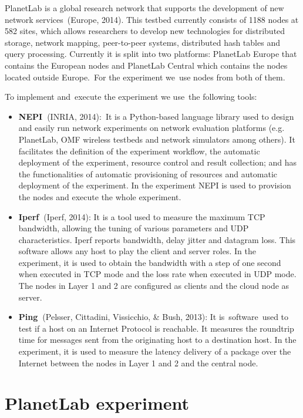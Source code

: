 \documentclass[a4paper]{article}
\newcommand\liststyleLFOiii{%
\renewcommand\labelitemi{[F0B7?]}
\renewcommand\labelitemii{o}
\renewcommand\labelitemiii{[F0A7?]}
\renewcommand\labelitemiv{[F0B7?]}
}
\begin{document}
PlanetLab is a global research network that supports the development of
new network services\ (Europe, 2014). This testbed currently consists
of 1188 nodes at 582 sites, which allows researchers to develop new
technologies for distributed storage, network mapping, peer-to-peer
systems, distributed hash tables and query processing. Currently it is
split into two platforms: PlanetLab Europe that contains the European
nodes and PlanetLab Central which contains the nodes located outside
Europe.\ For the experiment we\ use nodes from both of them.\ 

To implement and\ execute the experiment we use\ the following tools:\ 

\liststyleLFOiii
\begin{itemize}
\item \textbf{NEPI}\textbf{\ }(INRIA, 2014):\ It is a Python-based
language library used to design and easily run network experiments on
network evaluation platforms (e.g. PlanetLab, OMF wireless testbeds and
network simulators among others). It facilitates the definition of the
experiment workflow, the automatic deployment of the experiment,
resource control and result collection; and has the functionalities of
automatic provisioning of resources and automatic deployment of the
experiment. In the experiment NEPI is used to provision the nodes and
execute the whole experiment.\ 
\item \textbf{Iperf}\textbf{\ }(Iperf, 2014): It is a tool used to
measure the maximum TCP bandwidth, allowing the tuning of various
parameters and UDP characteristics. Iperf reports bandwidth, delay
jitter and datagram loss. This software allows any host to play the
client and server roles. In the experiment, it is used to obtain the
bandwidth with a step of one second when executed in TCP mode and the
loss rate when executed in UDP mode. The nodes in Layer 1 and 2 are
configured as clients and the cloud node as server.\ 
\item \textbf{Ping}\textbf{\ }(Pelsser, Cittadini, Vissicchio, \& Bush,
2013): It is\ software\ used to test if a host on an Internet Protocol
is reachable. It measures the roundtrip time for messages sent from the
originating host to a destination host. In the experiment, it is used
to measure the latency delivery of a package over the Internet between
the nodes in Layer 1 and 2 and the central node.
\end{itemize}

\bigskip

\section[PlanetLab experiment]{PlanetLab experiment}
\hypertarget{Toc387315384}{}
\bigskip
\end{document}
